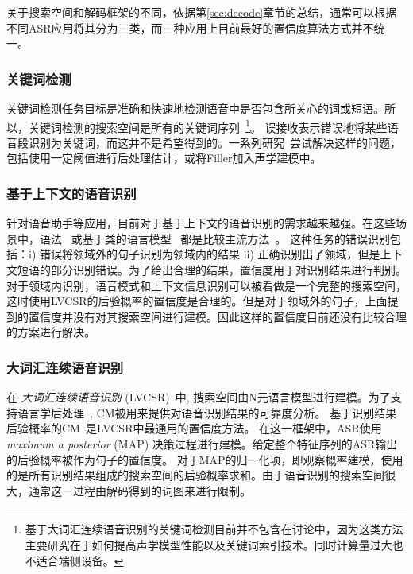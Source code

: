   关于搜索空间和解码框架的不同，依据第\ref{sec:decode}章节的总结，通常可以根据不同ASR应用将其分为三类，而三种应用上目前最好的置信度算法方式并不统一。

  \subsubsection{关键词检测}
    \label{Sec:kws-task}

      关键词检测任务目标是准确和快速地检测语音中是否包含所关心的词或短语。所以，关键词检测的搜索空间是所有的关键词序列~\footnote{基于大词汇连续语音识别的关键词检测目前并不包含在讨论中，因为这类方法主要研究在于如何提高声学模型性能以及关键词索引技术。同时计算量过大也不适合端侧设备。}。 误接收表示错误地将某些语音段识别为关键词，而这并不是希望得到的。一系列研究~\cite{young1994detecting,chen2014small}尝试解决这样的问题，包括使用一定阈值进行后处理估计，或将Filler加入声学建模中。

  \subsubsection{基于上下文的语音识别}
  \label{Sec:task-task}

  针对语音助手等应用，目前对于基于上下文的语音识别的需求越来越强。在这些场景中，语法~\cite{woodland1994large} 或基于类的语言模型~\cite{ward1996class} 都是比较主流方法~\cite{vasserman2016contextual}。
  这种任务的错误识别包括：i) 错误将领域外的句子识别为领域内的结果 ii) 正确识别出了领域，但是上下文短语的部分识别错误。为了给出合理的结果，置信度用于对识别结果进行判别。对于领域内识别，语音模式和上下文信息识别可以被看做是一个完整的搜索空间，这时使用LVCSR的后验概率的置信度是合理的。但是对于领域外的句子，上面提到的置信度并没有对其搜索空间进行建模。因此这样的置信度目前还没有比较合理的方案进行解决。

  \subsubsection{大词汇连续语音识别}
  \label{Sec:lvcsr-task}

  在 {\em 大词汇连续语音识别} (LVCSR)~\cite{woodland1994large}中,  搜索空间由N元语言模型进行建模。为了支持语言学后处理~\cite{hakkani2006beyond}, CM被用来提供对语音识别结果的可靠度分析。
  基于识别结果后验概率的CM~\cite{wessel2001confidence}是LVCSR中最通用的置信度方法。
  在这一框架中，ASR使用 {\em maximum a posterior} (MAP) 决策过程进行建模。给定整个特征序列的ASR输出的后验概率被作为句子的置信度。 对于MAP的归一化项，即观察概率建模，使用的是所有识别结果组成的搜索空间的后验概率求和。由于语音识别的搜索空间很大，通常这一过程由解码得到的词图来进行限制。


